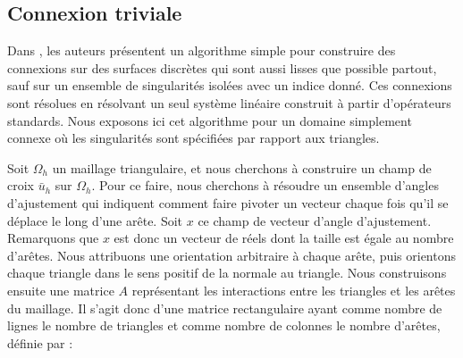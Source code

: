 \subsection{Connexion triviale}

Dans \cite{crane2010trivial}, les auteurs présentent un algorithme simple pour construire des connexions sur des surfaces discrètes qui sont aussi lisses que possible partout, sauf sur un ensemble de singularités isolées avec un indice donné. Ces connexions sont résolues en résolvant un seul système linéaire construit à partir d'opérateurs standards. Nous exposons ici cet algorithme pour un domaine simplement connexe où les singularités sont spécifiées par rapport aux triangles.

Soit $\Omega_h$ un maillage triangulaire, et nous cherchons à construire un champ de croix $\bar{u}_h$ sur $\Omega_h$. Pour ce faire, nous cherchons à résoudre un ensemble d'angles d'ajustement qui indiquent comment faire pivoter un vecteur chaque fois qu'il se déplace le long d'une arête. Soit $x$ ce champ de vecteur d'angle d'ajustement. Remarquons que $x$ est donc un vecteur de réels dont la taille est égale au nombre d'arêtes. Nous attribuons une orientation arbitraire à chaque arête, puis orientons chaque triangle dans le sens positif de la normale au triangle. Nous construisons ensuite une matrice $A$ représentant les interactions entre les triangles et les arêtes du maillage. Il s'agit donc d'une matrice rectangulaire ayant comme nombre de lignes le nombre de triangles et comme nombre de colonnes le nombre d'arêtes, définie par :


